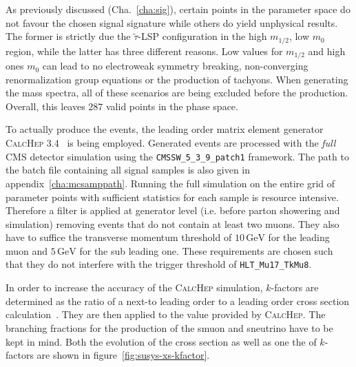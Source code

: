 As previously discussed (Cha.~\ref{cha:sig}), certain points in the parameter space do not favour the chosen signal signature while others do yield unphysical results. The former is strictly due the $\tilde{\tau}$-LSP configuration in the high $m_{1/2}$, low $m_0$ region, while the latter has three different reasons. Low values for $m_{1/2}$ and high ones $m_0$ can lead to no electroweak symmetry breaking, non-converging renormalization group equations or the production of tachyons. When generating the mass spectra, all of these scenarios are being excluded before the production. Overall, this leaves $287$ valid points in the phase space.

To actually produce the events, the leading order matrix element generator \textsc{CalcHep 3.4}~\cite{calchep} is being employed. Generated events are processed with the \textit{full} CMS detector simulation using the \verb+CMSSW_5_3_9_patch1+ framework. The path to the batch file containing all signal samples is also given in appendix~\ref{cha:mcsamppath}. Running the full simulation on the entire grid of parameter points with sufficient statistics for each sample is resource intensive. Therefore a filter is applied at generator level (i.e. before parton showering and simulation) removing events that do not contain at least two muons. They also have to suffice the transverse momentum threshold of $10\,\text{GeV}$ for the leading muon and $5\,\text{GeV}$ for the sub leading one. These requirements are chosen such that they do not interfere with the trigger threshold of \verb+HLT_Mu17_TkMu8+.

In order to increase the accuracy of the \textsc{CalcHep} simulation, $k$-factors are determined as the ratio of a next-to leading order to a leading order cross section calculation~\cite{susyxstool}. They are then applied to the value provided by \textsc{CalcHep}. The branching fractions for the production of the smuon and sneutrino have to be kept in mind. Both the evolution of the cross section as well as one the of $k$-factors are shown in figure~\ref{fig:susys-xs-kfactor}.

